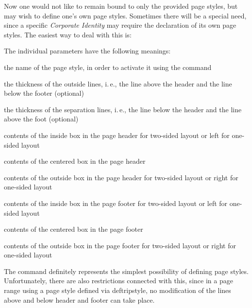 Now one would not like to remain bound to only the provided page
styles, but may wish to define one's own page styles.  Sometimes there
will be a special need, since a specific \emph{Corporate Identity} may
require the declaration of its own page styles.  The easiest way to
deal with this is:
\begin{Declaration}
%
%
%
\end{Declaration}%
The individual parameters have the following meanings:
\begin{labeling}[\,--]{}
\item[\PName{name}] the name of the page style, in order to activate it
        using the command 
\item[\PName{LO}] the thickness of the outside lines,
        i.\,e., the line above the header
        and the line below the footer (optional)
\item[\PName{LI}] the thickness of the separation lines,
        i.\,e., the line below the header
        and the line above the foot (optional)
\item[\PName{HI}] contents of the inside box in the page header for two-sided
        layout or left for one-sided layout
\item[\PName{HC}] contents of the centered box in the page header
\item[\PName{HO}] contents of the outside box in the page header for two-sided
        layout or right for one-sided layout
\item[\PName{FI}] contents of the inside box in the page footer for two-sided
        layout or left for one-sided layout
\item[\PName{FC}] contents of the centered box in the page footer
\item[\PName{FO}] contents of the outside box in the page footer for two-sided
        layout or right for one-sided layout
\end{labeling}

The command  definitely represents the simplest
possibility of defining page styles.  Unfortunately, there are also
restrictions connected with this, since in a page range using a page
style defined via deftripstyle, no modification of the lines above and
below header and footer can take place.

